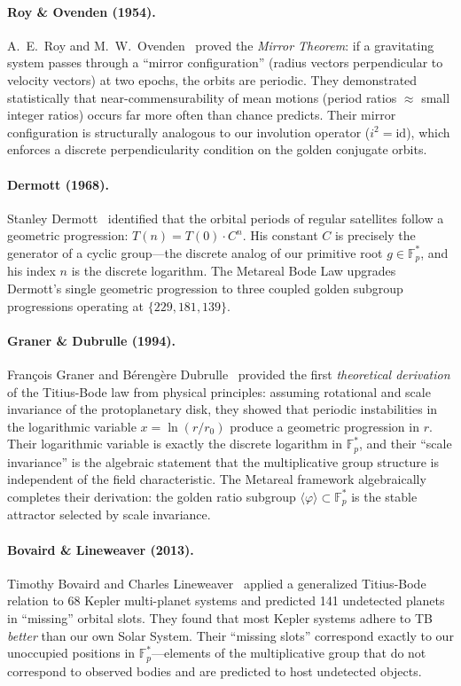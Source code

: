 \paragraph{Roy \& Ovenden (1954).}
A.~E.~Roy and M.~W.~Ovenden~\cite{roy1954} proved the \emph{Mirror Theorem}: if a gravitating system passes through a ``mirror configuration'' (radius vectors perpendicular to velocity vectors) at two epochs, the orbits are periodic. They demonstrated statistically that near-commensurability of mean motions (period ratios $\approx$ small integer ratios) occurs far more often than chance predicts. Their mirror configuration is structurally analogous to our involution operator ($i^2 = \mathrm{id}$), which enforces a discrete perpendicularity condition on the golden conjugate orbits.

\paragraph{Dermott (1968).}
Stanley Dermott~\cite{dermott1968} identified that the orbital periods of regular satellites follow a geometric progression: $T(n) = T(0) \cdot C^n$. His constant $C$ is precisely the generator of a cyclic group---the discrete analog of our primitive root $g \in \mathbb{F}_p^*$, and his index $n$ is the discrete logarithm. The Metareal Bode Law upgrades Dermott's single geometric progression to three coupled golden subgroup progressions operating at $\{229, 181, 139\}$.

\paragraph{Graner \& Dubrulle (1994).}
Fran\c{c}ois Graner and B\'{e}reng\`{e}re Dubrulle~\cite{graner1994} provided the first \emph{theoretical derivation} of the Titius-Bode law from physical principles: assuming rotational and scale invariance of the protoplanetary disk, they showed that periodic instabilities in the logarithmic variable $x = \ln(r/r_0)$ produce a geometric progression in $r$. Their logarithmic variable is exactly the discrete logarithm in $\mathbb{F}_p^*$, and their ``scale invariance'' is the algebraic statement that the multiplicative group structure is independent of the field characteristic. The Metareal framework algebraically completes their derivation: the golden ratio subgroup $\langle\varphi\rangle \subset \mathbb{F}_p^*$ is the stable attractor selected by scale invariance.

\paragraph{Bovaird \& Lineweaver (2013).}
Timothy Bovaird and Charles Lineweaver~\cite{bovaird2013} applied a generalized Titius-Bode relation to 68 Kepler multi-planet systems and predicted 141 undetected planets in ``missing'' orbital slots. They found that most Kepler systems adhere to TB \emph{better} than our own Solar System. Their ``missing slots'' correspond exactly to our unoccupied positions in $\mathbb{F}_p^*$---elements of the multiplicative group that do not correspond to observed bodies and are predicted to host undetected objects.

